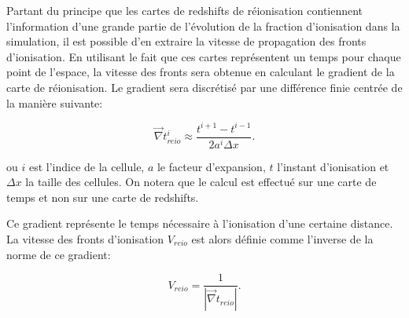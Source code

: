 Partant du principe que les cartes de redshifts de réionisation contiennent l'information d'une grande partie de l'évolution de la fraction d'ionisation dans la simulation, il est possible d'en extraire la vitesse de propagation des fronts d'ionisation.
En utilisant le fait que ces cartes représentent un temps pour chaque point de l'espace, la vitesse des fronts sera obtenue en calculant le gradient de la carte de réionisation.
Le gradient sera discrétisé par une différence finie centrée de la manière suivante:

\begin{equation}
\vec{\nabla} t_{reio}^i \approx \frac{t^{i+1}  - t^{i-1}}{2a^i \Delta x }. %
\end{equation}

ou $i$ est l'indice de la cellule, $a$ le facteur d'expansion, $t$ l'instant d'ionisation et $\Delta x$ la taille des cellules.
On notera que le calcul est effectué sur une carte de temps et non sur une carte de redshifts.

Ce gradient représente le temps nécessaire à l'ionisation d'une certaine distance.
La vitesse des fronts d'ionisation $V_{reio}$ est alors définie comme l'inverse de la norme de ce gradient:

\begin{equation}
V_{reio}  =  \frac{1}{\left | \vec{\nabla} t_{reio} \right|}  .
\end{equation}

